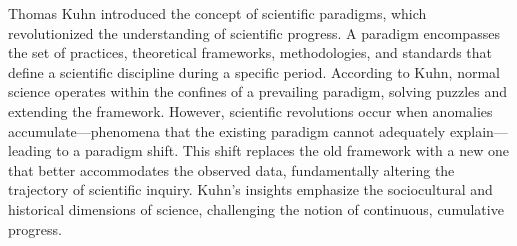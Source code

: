 Thomas Kuhn introduced the concept of scientific paradigms, which revolutionized the understanding of scientific progress. A paradigm encompasses the set of practices, theoretical frameworks, methodologies, and standards that define a scientific discipline during a specific period. According to Kuhn, normal science operates within the confines of a prevailing paradigm, solving puzzles and extending the framework. However, scientific revolutions occur when anomalies accumulate—phenomena that the existing paradigm cannot adequately explain—leading to a paradigm shift. This shift replaces the old framework with a new one that better accommodates the observed data, fundamentally altering the trajectory of scientific inquiry. Kuhn's insights emphasize the sociocultural and historical dimensions of science, challenging the notion of continuous, cumulative progress.

